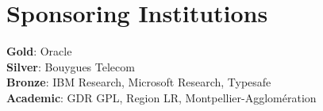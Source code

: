 
\section*{Sponsoring Institutions}
%
\textbf{Gold}: Oracle \\
\textbf{Silver}: Bouygues Telecom \\
\textbf{Bronze}: IBM Research, Microsoft Research, Typesafe \\
\textbf{Academic}: GDR GPL, Region LR, Montpellier-Agglomération